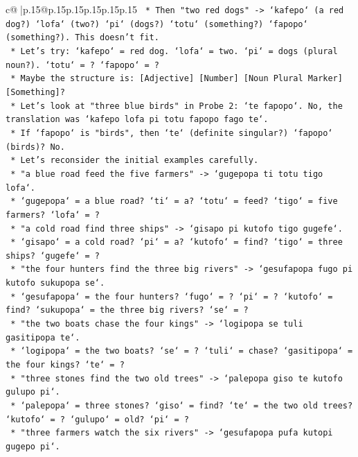 \documentclass{article}
\begin{document}
{\begin{supertabular}{c@{$\;$}|p{.15\linewidth}@{}p{.15\linewidth}p{.15\linewidth}p{.15\linewidth}p{.15\linewidth}p{.15\linewidth}}
{{{\texttt{        *   Then "two red dogs" {-}> `kafepo` (a red dog?) `lofa` (two?) `pi` (dogs?) `totu` (something?) `fapopo` (something?). This doesn't fit.} \\
\texttt{        *   Let's try: `kafepo` = red dog. `lofa` = two. `pi` = dogs (plural noun?). `totu` = ? `fapopo` = ?} \\
\texttt{        *   Maybe the structure is: {[}Adjective{]} {[}Number{]} {[}Noun Plural Marker{]} {[}Something{]}?} \\
\texttt{        *   Let's look at "three blue birds" in Probe 2: `te fapopo`. No, the translation was `kafepo lofa pi totu fapopo fago te`.} \\
\texttt{        *   If `fapopo` is "birds", then `te` (definite singular?) `fapopo` (birds)? No.} \\
\texttt{        *   Let's reconsider the initial examples carefully.} \\
\texttt{        *   "a blue road feed the five farmers" {-}> `gugepopa ti totu tigo lofa`.} \\
\texttt{            *   `gugepopa` = a blue road? `ti` = a? `totu` = feed? `tigo` = five farmers? `lofa` = ?} \\
\texttt{        *   "a cold road find three ships" {-}> `gisapo pi kutofo tigo gugefe`.} \\
\texttt{            *   `gisapo` = a cold road? `pi` = a? `kutofo` = find? `tigo` = three ships? `gugefe` = ?} \\
\texttt{        *   "the four hunters find the three big rivers" {-}> `gesufapopa fugo pi kutofo sukupopa se`.} \\
\texttt{            *   `gesufapopa` = the four hunters? `fugo` = ? `pi` = ? `kutofo` = find? `sukupopa` = the three big rivers? `se` = ?} \\
\texttt{        *   "the two boats chase the four kings" {-}> `logipopa se tuli gasitipopa te`.} \\
\texttt{            *   `logipopa` = the two boats? `se` = ? `tuli` = chase? `gasitipopa` = the four kings? `te` = ?} \\
\texttt{        *   "three stones find the two old trees" {-}> `palepopa giso te kutofo gulupo pi`.} \\
\texttt{            *   `palepopa` = three stones? `giso` = find? `te` = the two old trees? `kutofo` = ? `gulupo` = old? `pi` = ?} \\
\texttt{        *   "three farmers watch the six rivers" {-}> `gesufapopa pufa kutopi gugepo pi`.} \\
}}}
\end{supertabular}}
\end{document}
